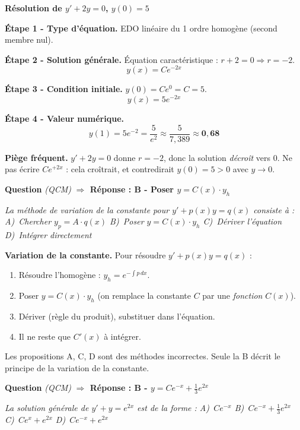 \documentclass[11pt,a4paper]{article}
\newcounter{qnum}
\newcommand{\qtitre}[2]{%
  \stepcounter{qnum}%
  \medskip\noindent
  \textbf{\color{bleutexte}Question \theqnum}\enspace
  \textit{(#1)}\enspace
  \textcolor{vertok}{\textbf{$\Rightarrow$ Réponse : #2}}
  \par\smallskip
}
\newcommand{\qenonce}[1]{%
  \begin{mdframed}[backgroundcolor=grisbox, linewidth=0pt,
    innerleftmargin=8pt, innerrightmargin=8pt,
    innertopmargin=5pt, innerbottommargin=5pt,
    skipabove=2pt, skipbelow=4pt]
  \small\textit{#1}
  \end{mdframed}
}
\begin{document}
\begin{reponsebox}
\textbf{Résolution de $y' + 2y = 0$, $y(0) = 5$}

\smallskip\textbf{Étape 1 - Type d'équation.}
EDO linéaire du 1\ier{} ordre homogène (second membre nul).

\smallskip\textbf{Étape 2 - Solution générale.}
Équation caractéristique : $r + 2 = 0 \Rightarrow r = -2$.
$$y(x) = Ce^{-2x}$$

\smallskip\textbf{Étape 3 - Condition initiale.}
$y(0) = Ce^{0} = C = 5$.
$$\boxed{y(x) = 5e^{-2x}}$$

\smallskip\textbf{Étape 4 - Valeur numérique.}
$$y(1) = 5e^{-2} = \frac{5}{e^2} \approx \frac{5}{7{,}389} \approx \mathbf{0{,}68}$$
\end{reponsebox}

\begin{piegebox}
\textbf{Piège fréquent.} $y' + 2y = 0$ donne $r = -2$, donc la solution \emph{décroît} vers 0. Ne pas écrire $Ce^{+2x}$ : cela croîtrait, et contredirait $y(0) = 5 > 0$ avec $y \to 0$.
\end{piegebox}

\qtitre{QCM}{B - Poser $y = C(x)\cdot y_h$}
\qenonce{La méthode de variation de la constante pour $y' + p(x)y = q(x)$ consiste à :
\quad A)~Chercher $y_p = A\cdot q(x)$ \quad B)~Poser $y = C(x)\cdot y_h$ \quad C)~Dériver l'équation \quad D)~Intégrer directement}

\begin{methodebox}
\textbf{Variation de la constante.} Pour résoudre $y' + p(x)y = q(x)$ :
\begin{enumerate}[itemsep=1pt, topsep=2pt]
  \item Résoudre l'homogène : $y_h = e^{-\int p\,dx}$.
  \item Poser $y = C(x)\cdot y_h$ (on remplace la constante $C$ par une \emph{fonction} $C(x)$).
  \item Dériver (règle du produit), substituer dans l'équation.
  \item Il ne reste que $C'(x)$ à intégrer.
\end{enumerate}
\end{methodebox}

Les propositions A, C, D sont des méthodes incorrectes. Seule la B décrit le principe de la variation de la constante.

\qtitre{QCM}{B - $y = Ce^{-x} + \tfrac{1}{3}e^{2x}$}
\qenonce{La solution générale de $y' + y = e^{2x}$ est de la forme :
\quad A)~$Ce^{-x}$ \quad B)~$Ce^{-x} + \tfrac{1}{3}e^{2x}$ \quad C)~$Ce^{x} + e^{2x}$ \quad D)~$Ce^{-x} + e^{2x}$}
\end{document}
